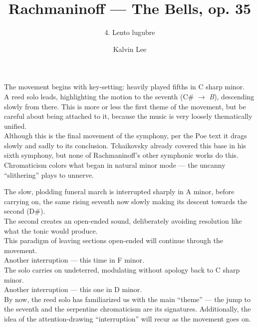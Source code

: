 \documentclass{beamer}
\title{Rachmaninoff --- The Bells, op. 35}
\subtitle{4. Lento lugubre}
\author{Kalvin Lee}
\date{}
\begin{document}
 

\begin{frame} 
  \titlepage
\end{frame} 

\begin{frame}
  The movement begins with key-setting: heavily played fifths in C sharp minor. 
  \pause \\ 
  A reed solo leads, highlighting the motion to the seventh (C\# \(\to\) \emph{B}), descending slowly from there. This is more or less the first theme of the movement, but be careful about being attached to it, because the music is very loosely thematically unified. 
  \pause \\ 
  Although this is the final movement of the symphony, per the Poe text it drags slowly and sadly to its conclusion. Tchaikovsky already covered this base in his sixth symphony, but none of Rachmaninoff's other symphonic works do this. 
  \pause \\
  Chromaticism colors what began in natural minor mode --- the uncanny ``slithering'' plays to unnerve. 
\end{frame} 

\begin{frame} 
  The slow, plodding funeral march is interrupted sharply in A minor, \pause before carrying on, \pause the same rising seventh now slowly making its descent towards the second (D\#). 
  \pause \\
  The second creates an open-ended sound, deliberately avoiding resolution like what the tonic would produce. 
  \pause \\ 
  This paradigm of leaving sections open-ended will continue through the movement. 
  \pause \\ 
  Another interruption --- this time in F minor. 
  \pause \\ 
  The solo carries on undeterred, modulating without apology back to C sharp minor. 
  \pause \\ 
  Another interruption --- this one in D minor. 
  \pause \\ 
  By now, the reed solo has familiarized us with the main ``theme''  --- the jump to the seventh and the serpentine chromaticism are its signatures. Additionally, the idea of the attention-drawing ``interruption'' will recur as the movement goes on. 
\end{frame} 
\end{document}
